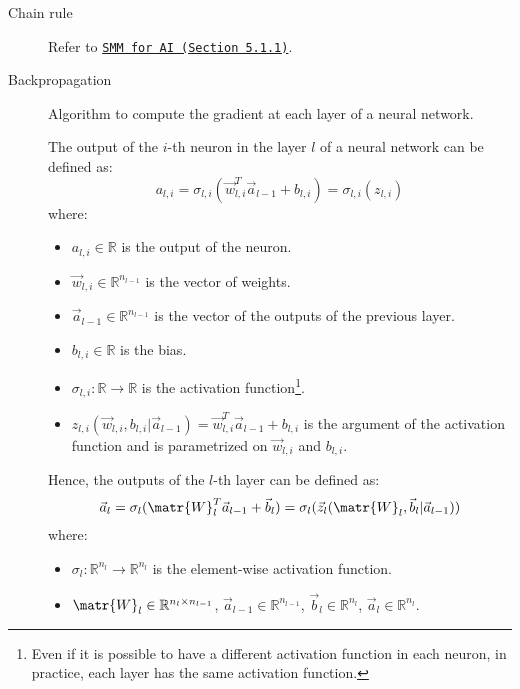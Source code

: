 \begin{description}
    \item[Chain rule] 
        Refer to \href{\gitSMM{}}{\texttt{SMM for AI (Section 5.1.1)}}.
    
    \item[Backpropagation] 
        Algorithm to compute the gradient at each layer of a neural network.

        The output of the $i$-th neuron in the layer $l$ of a neural network can be defined as:
        \[ a_{l,i} = \sigma_{l,i}( \vec{w}_{l,i}^T \vec{a}_{l-1} + b_{l,i} ) = \sigma_{l,i}(z_{l,i})\]
        where:
        \begin{itemize}
            \item $a_{l,i} \in \mathbb{R}$ is the output of the neuron.
            \item $\vec{w}_{l,i} \in \mathbb{R}^{n_{l-1}}$ is the vector of weights.
            \item $\vec{a}_{l-1} \in \mathbb{R}^{n_{l-1}}$ is the vector of the outputs of the previous layer.
            \item $b_{l,i} \in \mathbb{R}$ is the bias.
            \item $\sigma_{l,i}: \mathbb{R} \rightarrow \mathbb{R}$ is the activation function\footnote{Even if it is possible to have a different activation function in each neuron, in practice, each layer has the same activation function.}.
            \item $z_{l,i}(\vec{w}_{l,i}, b_{l,i} | \vec{a}_{l-1}) = \vec{w}_{l,i}^T \vec{a}_{l-1} + b_{l,i}$ is the argument of the activation function and is parametrized on $\vec{w}_{l,i}$ and $b_{l,i}$.
        \end{itemize}

        Hence, the outputs of the $l$-th layer can be defined as:
        \[ \vec{a}_l = \sigma_l( \matr{W}_l^T \vec{a}_{l-1} + \vec{b}_l ) = \sigma_l( \vec{z}_l(\matr{W}_l, \vec{b}_l | \vec{a}_{l-1}) ) \]
        where: 
        \begin{itemize}
            \item $\sigma_l: \mathbb{R}^{n_l} \rightarrow \mathbb{R}^{n_l}$ is the element-wise activation function.
            \item 
                $\matr{W}_l \in \mathbb{R}^{n_l \times n_{l-1}}$, 
                $\vec{a}_{l-1} \in \mathbb{R}^{n_{l-1}}$,
                $\vec{b}_l \in \mathbb{R}^{n_l}$,
                $\vec{a}_l \in \mathbb{R}^{n_l}$.
        \end{itemize}


\end{description}

